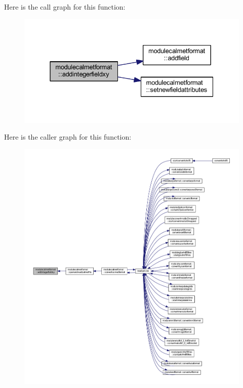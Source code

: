 Here is the call graph for this function\+:\nopagebreak
\begin{figure}[H]
\begin{center}
\leavevmode
\includegraphics[width=331pt]{namespacemodulecalmetformat_a26c3210caedd039907d56c2a6b8d30c4_cgraph}
\end{center}
\end{figure}
Here is the caller graph for this function\+:\nopagebreak
\begin{figure}[H]
\begin{center}
\leavevmode
\includegraphics[width=350pt]{namespacemodulecalmetformat_a26c3210caedd039907d56c2a6b8d30c4_icgraph}
\end{center}
\end{figure}
\mbox{\label{namespacemodulecalmetformat_a62bd4a5f15fb34c0505c736e02ac62ca}} 
